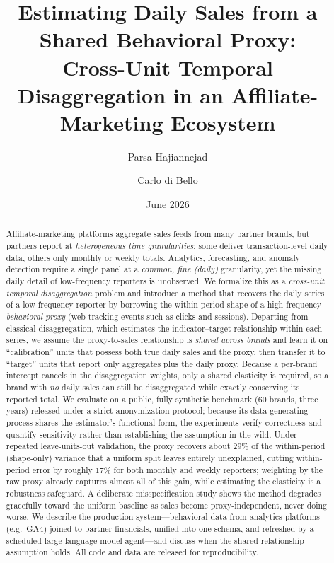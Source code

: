 \documentclass[11pt]{article}
\title{\bfseries Estimating Daily Sales from a Shared Behavioral Proxy:\\
Cross-Unit Temporal Disaggregation in an Affiliate-Marketing Ecosystem}
\author[1]{Parsa Hajiannejad}
\author[1]{Carlo di Bello}
\affil[1]{Universitybox}
\date{June 2026}
\begin{document}
\maketitle

\begin{abstract}
\noindent
Affiliate-marketing platforms aggregate sales feeds from many partner brands,
but partners report at \emph{heterogeneous time granularities}: some deliver
transaction-level daily data, others only monthly or weekly totals. Analytics,
forecasting, and anomaly detection require a single panel at a \emph{common,
fine (daily)} granularity, yet the missing daily detail of low-frequency
reporters is unobserved. We formalize this as a \emph{cross-unit temporal
disaggregation} problem and introduce a method that recovers the daily series of
a low-frequency reporter by borrowing the within-period shape of a
high-frequency \emph{behavioral proxy} (web tracking events such as clicks and
sessions). Departing from classical disaggregation, which estimates the
indicator--target relationship within each series, we assume the
proxy-to-sales relationship is \emph{shared across brands} and learn it on
``calibration'' units that possess both true daily sales and the proxy, then
transfer it to ``target'' units that report only aggregates plus the daily
proxy. Because a per-brand intercept cancels in the disaggregation weights,
only a shared elasticity is required, so a brand with \emph{no} daily sales can
still be disaggregated while exactly conserving its reported total. We evaluate
on a public, fully synthetic benchmark (60 brands, three years) released under a
strict anonymization protocol; because its data-generating process shares the
estimator's functional form, the experiments verify correctness and quantify
sensitivity rather than establishing the assumption in the wild. Under repeated
leave-units-out validation, the proxy recovers about $29\%$ of the
within-period (shape-only) variance that a uniform split leaves entirely
unexplained, cutting within-period error by roughly $17\%$ for both monthly and
weekly reporters; weighting by the raw proxy already captures almost all of this
gain, while estimating the elasticity is a robustness safeguard. A deliberate
misspecification study shows the method degrades gracefully toward the uniform
baseline as sales become proxy-independent, never doing worse. We describe the
production system---behavioral
data from analytics platforms (e.g.\ GA4) joined to partner financials,
unified into one schema, and refreshed by a scheduled large-language-model
agent---and discuss when the shared-relationship assumption holds. All code and
data are released for reproducibility.
\end{abstract}
\end{document}
